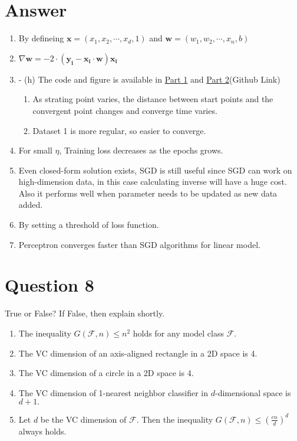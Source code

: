 \documentclass[
	12pt, %
]{fphw}
\begin{document}
\section*{Answer}
\begin{enumerate}
	\item By defineing $\mathbf{x} = (x_1,x_2,\cdots,x_d, 1)$ and $\mathbf{w} = (w_1,w_2,\cdots,x_n, b)$
	\item $ \nabla \mathbf{w}= -2 \cdot (\mathbf{y_i} - \mathbf{x_i} \cdot \mathbf{w}) \mathbf{x_i}$
	\item - (h) The code and figure is available in \href{https://github.com/fanyimeng0/AIR6002/blob/main/HW1/Code/notebook_7_part1.ipynb}{Part 1} and 
	\href{https://github.com/fanyimeng0/AIR6002/blob/main/HW1/Code/notebook_7_part2.ipynb}{Part 2}(Github Link)
	\begin{enumerate}[(\itshape 1\normalfont)]
		\item As strating point varies, the distance between start points and the convergent point changes and converge time varies.
		\item Dataset 1 is more regular, so easier to converge.
	\end{enumerate}
	\setcounter{enumi}{6}
	\item For small $\eta$, Training loss decreases as the epochs grows.
	\setcounter{enumi}{8}
	\item Even closed-form solution exists, SGD is still useful since SGD can work on high-dimension data, in this case calculating inverse will have a huge cost. Also it performs well when parameter needs to be updated as new data added. 
	\item By setting a threshold of loss function.
	\item Perceptron converges faster than SGD algorithms for linear model.
\end{enumerate}
\section*{Question 8}

\begin{problem}
True or False? If False, then explain shortly.
\medskip
\begin{enumerate}
\item The inequality $G(\mathcal{F},n)\leq n^2$ holds for any model class $\mathcal{F}.$
\item The VC dimension of an axis-aligned rectangle in a 2D space is 4.
\item The VC dimension of a circle in a 2D space is 4.
\item The VC dimension of 1-nearest neighbor classifier in $d$-dimensional space is $d+1.$
\item Let $d$ be the VC dimension of $\mathcal{F}$. Then the inequality $G(\mathcal{F},n)\leq\left(\frac{en}d\right)^d$ always holds.
\end{enumerate}
\end{problem}
\end{document}
